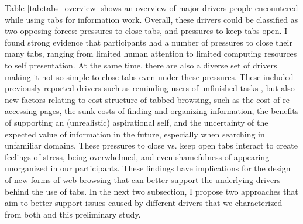 Table \ref{tab:tabs_overview} shows an overview of major drivers people encountered while using tabs for information work.
Overall, these drivers could be classified as two opposing forces: pressures to close tabs, and pressures to keep tabs open.  I found strong evidence that participants had a number of pressures to close their many tabs, ranging from limited human attention to limited computing resources to self presentation.  At the same time, there are also a diverse set of drivers making it not so simple to close tabs even under these pressures. These included previously reported drivers such as reminding users of unfinished tasks \cite{Dubroy:2010:STB:1753326.1753426}, but also new factors relating to cost structure of tabbed browsing, such as the cost of re-accessing pages, the sunk costs of finding and organizing information, the benefits of supporting an (unrealistic) aspirational self, and the uncertainty of the expected value of information in the future, especially when searching in unfamiliar domains. These pressures to close vs. keep open tabs interact to create feelings of stress, being overwhelmed, and even shamefulness of appearing unorganized in our participants. These findings have implications for the design of new forms of web browsing that can better support the underlying drivers behind the use of tabs. In the next two subsection, I propose two approaches that aim to better support issues caused by different drivers that we characterized from both  and this preliminary study.

